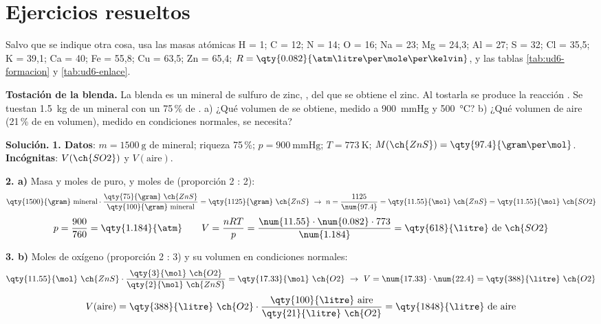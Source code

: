 
\section{Ejercicios resueltos}\label{sec:ud6-resueltos}

Salvo que se indique otra cosa, usa las masas atómicas H = 1; C = 12; N = 14; O = 16; Na = 23; Mg = 24,3; Al = 27; S = 32;
Cl = 35,5; K = 39,1; Ca = 40; Fe = 55,8; Cu = 63,5; Zn = 65,4; \(R = \qty{0.082}{\atm\litre\per\mole\per\kelvin}\), y las tablas
\ref{tab:ud6-formacion} y \ref{tab:ud6-enlace}.

\begin{example}
    \textbf{Tostación de la blenda.} La blenda es un mineral de sulfuro de zinc, , del que se obtiene el zinc. Al tostarla
    se produce la reacción . Se tuestan \qty{1.5}{\kilo\gram} de un mineral con
    un 75\,\% de . a) ¿Qué volumen de  se obtiene, medido a \qty{900}{\mmHg} y \qty{500}{\degreeCelsius}? b) ¿Qué
    volumen de aire (21\,\% de  en volumen), medido en condiciones normales, se necesita?

    \textbf{Solución.} \textbf{1. Datos}: \(m = \qty{1500}{\gram}\) de mineral; riqueza 75\,\%; \(p = \qty{900}{\mmHg}\);
    \(T = \qty{773}{\kelvin}\); \(M(\ch{ZnS}) = \qty{97.4}{\gram\per\mol}\). \textbf{Incógnitas}: \(V(\ch{SO2})\) y \(V(\text{aire})\).

    \textbf{2. a)} Masa y moles de  puro, y moles de  (proporción 2 : 2):
    \[ \qty{1500}{\gram}\ \text{mineral} \cdot \frac{\qty{75}{\gram}\ \ch{ZnS}}{\qty{100}{\gram}\ \text{mineral}} = \qty{1125}{\gram}\ \ch{ZnS}
    \ \rightarrow\ n = \frac{1125}{\num{97.4}} = \qty{11.55}{\mol}\ \ch{ZnS} = \qty{11.55}{\mol}\ \ch{SO2} \]
    \[ p = \frac{900}{760} = \qty{1.184}{\atm} \qquad V = \frac{n R T}{p} = \frac{\num{11.55} \cdot \num{0.082} \cdot 773}{\num{1.184}}
    = \qty{618}{\litre}\ \text{de}\ \ch{SO2} \]

    \textbf{3. b)} Moles de oxígeno (proporción 2 : 3) y su volumen en condiciones normales:
    \[ \qty{11.55}{\mol}\ \ch{ZnS} \cdot \frac{\qty{3}{\mol}\ \ch{O2}}{\qty{2}{\mol}\ \ch{ZnS}} = \qty{17.33}{\mol}\ \ch{O2}
    \ \rightarrow\ V = \num{17.33} \cdot \num{22.4} = \qty{388}{\litre}\ \ch{O2} \]
    \[ V(\text{aire}) = \qty{388}{\litre}\ \ch{O2} \cdot \frac{\qty{100}{\litre}\ \text{aire}}{\qty{21}{\litre}\ \ch{O2}} = \qty{1848}{\litre}\ \text{de aire} \]
\end{example}

